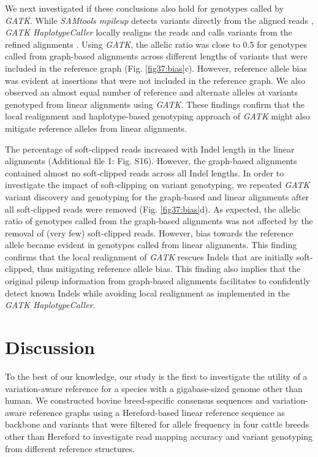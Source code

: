 \documentclass[../main.tex]{subfiles}
\begin{document}
We next investigated if these conclusions also hold for genotypes called by \emph{GATK}. While \emph{SAMtools mpileup} detects variants directly from the aligned reads \citep{li2009sequence}, \emph{GATK HaplotypeCaller} locally realigns the reads and calls variants from the refined alignments \citep{poplin2017scaling}. Using \emph{GATK}, the allelic ratio was close to 0.5 for genotypes called from graph-based alignments across different lengths of variants that were included in the reference graph (Fig. \ref{fig37:bias}c). However, reference allele bias was evident at insertions that were not included in the reference graph. We also observed an almost equal number of reference and alternate alleles at variants genotyped from linear alignments using \emph{GATK}. These findings confirm that the local realignment and haplotype-based genotyping approach of \emph{GATK} might also mitigate reference alleles from linear alignments.

The percentage of soft-clipped reads increased with Indel length in the linear alignments (Additional file 1: Fig. S16). However, the graph-based alignments contained almost no soft-clipped reads across all Indel lengths. In order to investigate the impact of soft-clipping on variant genotyping, we repeated \emph{GATK} variant discovery and genotyping for the graph-based and linear alignments after all soft-clipped reads were removed (Fig. \ref{fig37:bias}d). As expected, the allelic ratio of genotypes called from the graph-based alignments was not affected by the removal of (very few) soft-clipped reads. However, bias towards the reference allele became evident in genotypes called from linear alignments. This finding confirms that the local realignment of \emph{GATK} rescues Indels that are initially soft-clipped, thus mitigating reference allele bias. This finding also implies that the original pileup information from graph-based alignments facilitates to confidently detect known Indels while avoiding local realignment as implemented in the \emph{GATK HaplotypeCaller}.

\section{Discussion}

To the best of our knowledge, our study is the first to investigate the utility of a variation-aware reference for a species with a gigabase-sized genome other than human. We constructed bovine breed-specific consensus sequences and variation-aware reference graphs using a Hereford-based linear reference sequence as backbone and variants that were filtered for allele frequency in four cattle breeds other than Hereford to investigate read mapping accuracy and variant genotyping from different reference structures.
\end{document}
